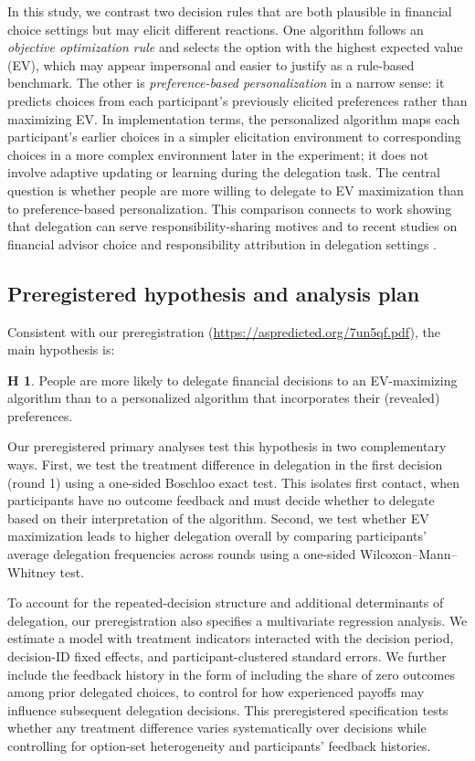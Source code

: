 \documentclass[a4paper, 12pt, fleqn]{article}
\theoremstyle{definition}
\newtheorem{hyp}{H}
\begin{document}
In this study, we contrast two decision rules that are both plausible in financial choice settings but may elicit different reactions. One algorithm follows an \emph{objective optimization rule} and selects the option with the highest expected value (EV), which may appear impersonal and easier to justify as a rule-based benchmark. The other is \emph{preference-based personalization} in a narrow sense: it predicts choices from each participant's previously elicited preferences rather than maximizing EV. In implementation terms, the personalized algorithm maps each participant's earlier choices in a simpler elicitation environment to corresponding choices in a more complex environment later in the experiment; it does not involve adaptive updating or learning during the delegation task.
The central question is whether people are more willing to delegate to EV maximization than to preference-based personalization. This comparison connects to work showing that delegation can serve responsibility-sharing motives \citep{Kirchkamp2019} and to recent studies on financial advisor choice and responsibility attribution in delegation settings \citep{Ismagilova2025,Werner2026}.

\subsection*{Preregistered hypothesis and analysis plan}
Consistent with our preregistration ({\scriptsize\url{https://aspredicted.org/7un5qf.pdf}}), the main hypothesis is: 
\begin{hyp}
	People are more likely to delegate financial decisions to an EV-maximizing algorithm than to a personalized algorithm that incorporates their (revealed) preferences.
\end{hyp}

Our preregistered primary analyses test this hypothesis in two complementary ways. First, we test the treatment difference in delegation in the first decision (round 1) using a one-sided Boschloo exact test. This isolates first contact, when participants have no outcome feedback and must decide whether to delegate based on their interpretation of the algorithm. Second, we test whether EV maximization leads to higher delegation overall by comparing participants' average delegation frequencies across rounds using a one-sided Wilcoxon--Mann--Whitney test.

To account for the repeated-decision structure and additional determinants of delegation, our preregistration also specifies a multivariate regression analysis. We estimate a model with treatment indicators interacted with the decision period, decision-ID fixed effects, and participant-clustered standard errors. We further include the feedback history in the form of including the share of zero outcomes among prior delegated choices, to control for how experienced payoffs may influence subsequent delegation decisions. This preregistered specification tests whether any treatment difference varies systematically over decisions while controlling for option-set heterogeneity and participants' feedback histories.
\end{document}
